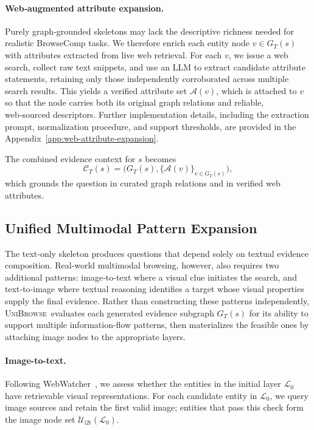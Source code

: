 \documentclass[11pt]{article}
\newcommand{\modelname}{\textsc{UniBrowse}}
\begin{document}
\paragraph{Web‑augmented attribute expansion.}
Purely graph‑grounded skeletons may lack the descriptive richness needed for realistic BrowseComp tasks. 
We therefore enrich each entity node $v \in G_T(s)$ with attributes extracted from live web retrieval. 
For each $v$, we issue a web search, collect raw text snippets, and use an LLM to extract candidate attribute statements, retaining only those independently corroborated across multiple search results. 
This yields a verified attribute set $\mathcal{A}(v)$, which is attached to $v$ so that the node carries both its original graph relations and reliable, web‑sourced descriptors. 
Further implementation details, including the extraction prompt, normalization procedure, and support thresholds, are provided in the Appendix~\ref{app:web-attribute-expansion}.

The combined evidence context for $s$ becomes
\begin{equation}
\mathcal{C}_T(s) = \bigl(G_T(s), \{\mathcal{A}(v)\}_{v \in G_T(s)}\bigr),
\end{equation}
which grounds the question in curated graph relations and in verified web attributes.

\subsection{Unified Multimodal Pattern Expansion}
\label{sec:multimodal-expansion}

The text‑only skeleton produces questions that depend solely on textual evidence composition. Real‑world multimodal browsing, however, also requires two additional patterns: image‑to‑text where a visual clue initiates the search, and text‑to‑image where textual reasoning identifies a target whose visual properties supply the final evidence. Rather than constructing these patterns independently, \modelname\ evaluates each generated evidence subgraph $G_T(s)$ for its ability to support multiple information-flow patterns, then materializes the feasible ones by attaching image nodes to the appropriate layers.

\paragraph{Image-to-text.}
Following WebWatcher~\citep{geng2025webwatcher}, we assess whether the entities in the initial layer $\mathcal{L}_0$ have retrievable visual representations. For each candidate entity in $\mathcal{L}_0$, we query image sources and retain the first valid image; entities that pass this check form the image node set $\mathcal{U}_{\mathrm{i2t}}(\mathcal{L}_0)$.
\end{document}

